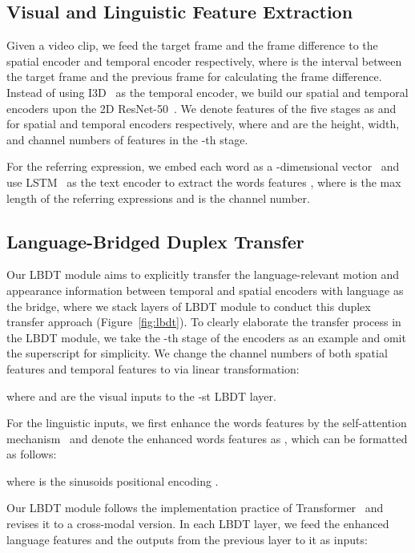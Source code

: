 \documentclass[10pt,twocolumn,letterpaper]{article}
\begin{document}
\subsection{Visual and Linguistic Feature Extraction}
\label{sec:method:enc}

Given a video clip, we feed the target frame  and the frame difference  to the spatial encoder and temporal encoder respectively, where  is the interval between the target frame and the previous frame for calculating the frame difference. Instead of using I3D~\cite{CarreiraZ17} as the temporal encoder, we build our spatial and temporal encoders upon the 2D ResNet-50~\cite{He2016CVPR}. We denote features of the five stages as  and  for spatial and temporal encoders respectively, where  and  are the height, width, and channel numbers of features in the -th stage.

For the referring expression, we embed each word as a -dimensional vector~\cite{pennington2014glove} and use LSTM~\cite{hochreiter1997long} as the text encoder to extract the words features , where  is the max length of the referring expressions and  is the channel number.


\subsection{Language-Bridged Duplex Transfer}
\label{sec:method:lmdtm}

Our LBDT module aims to explicitly transfer the language-relevant motion and appearance information between temporal and spatial encoders with language as the bridge, where we stack  layers of LBDT module to conduct this duplex transfer approach (Figure~\ref{fig:lbdt}).
To clearly elaborate the transfer process in the LBDT module, we take the -th stage of the encoders as an example and omit the superscript  for simplicity. We change the channel numbers of both spatial features  and temporal features  to  via linear transformation:

where  and  are the visual inputs to the -st LBDT layer.

For the linguistic inputs, we first enhance the words features  by the self-attention mechanism~\cite{vaswani2017attention} and denote the enhanced words features as , which can be formatted as follows:

where  is the sinusoids positional encoding \cite{vaswani2017attention}.

Our LBDT module follows the implementation practice of Transformer~\cite{vaswani2017attention} and revises it to a cross-modal version.
In each LBDT layer, we feed the enhanced language features  and the outputs from the previous layer to it as inputs:
\end{document}
